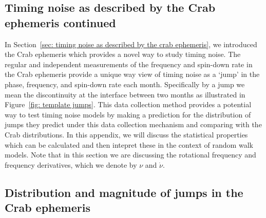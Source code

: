 \documentclass[../full_thesis/full_thesis.tex]{subfiles}
\begin{document}
\begin{subappendices}
\section{Timing noise as described by the Crab ephemeris continued}
\label{sec: crab ephem cont}

In Section~\ref{sec: timing noise as described by the crab ephemeris}, we
introduced the Crab ephemeris which provides a novel way to study timing noise.
The regular and independent measurements of the frequency and spin-down rate in
the Crab ephemeris provide a unique way view of timing noise as a `jump' in the
phase, frequency, and spin-down rate each month. Specifically by a jump we mean
the discontinuity at the interface between two months as illustrated in
Figure~\ref{fig: template jumps}.  This data collection method provides a
potential way to test timing noise models by making a prediction for the
distribution of jumps they predict under this data collection mechanism and
comparing with the Crab distributions.  In this appendix, we will discuss the
statistical properties which can be calculated and then intepret these in the
context of random walk models. Note that in this section we are discussing the
rotational frequency and frequency derivatives, which we denote by $\nu$ and
$\dot{\nu}$.

\subsection{Distribution and magnitude of jumps in the Crab ephemeris}
\label{sec: jumps}


\end{subappendices}
\end{document}

